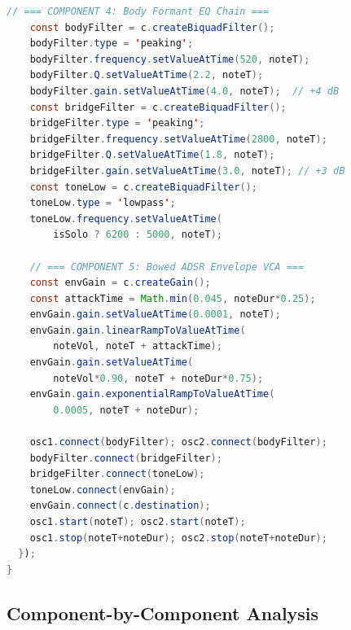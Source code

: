 \documentclass[10pt,journal,compsoc,twocolumn]{article}
\begin{document}
\begin{lstlisting}[language=Java,
    caption={\texttt{shimViolin}: complete 5-component teardown (line 4103).},
    label={lst:violin}]
    // === COMPONENT 4: Body Formant EQ Chain ===
    const bodyFilter = c.createBiquadFilter();
    bodyFilter.type = 'peaking';
    bodyFilter.frequency.setValueAtTime(520, noteT);
    bodyFilter.Q.setValueAtTime(2.2, noteT);
    bodyFilter.gain.setValueAtTime(4.0, noteT);  // +4 dB
    const bridgeFilter = c.createBiquadFilter();
    bridgeFilter.type = 'peaking';
    bridgeFilter.frequency.setValueAtTime(2800, noteT);
    bridgeFilter.Q.setValueAtTime(1.8, noteT);
    bridgeFilter.gain.setValueAtTime(3.0, noteT); // +3 dB
    const toneLow = c.createBiquadFilter();
    toneLow.type = 'lowpass';
    toneLow.frequency.setValueAtTime(
        isSolo ? 6200 : 5000, noteT);

    // === COMPONENT 5: Bowed ADSR Envelope VCA ===
    const envGain = c.createGain();
    const attackTime = Math.min(0.045, noteDur*0.25);
    envGain.gain.setValueAtTime(0.0001, noteT);
    envGain.gain.linearRampToValueAtTime(
        noteVol, noteT + attackTime);
    envGain.gain.setValueAtTime(
        noteVol*0.90, noteT + noteDur*0.75);
    envGain.gain.exponentialRampToValueAtTime(
        0.0005, noteT + noteDur);

    osc1.connect(bodyFilter); osc2.connect(bodyFilter);
    bodyFilter.connect(bridgeFilter);
    bridgeFilter.connect(toneLow);
    toneLow.connect(envGain);
    envGain.connect(c.destination);
    osc1.start(noteT); osc2.start(noteT);
    osc1.stop(noteT+noteDur); osc2.stop(noteT+noteDur);
  });
}
\end{lstlisting}

\subsection{Component-by-Component Analysis}
\end{document}
